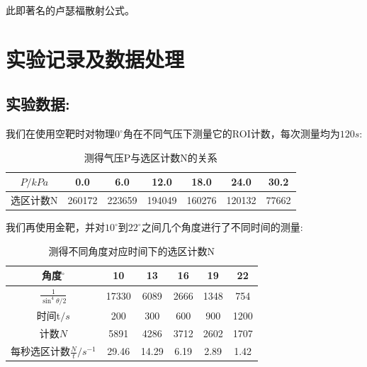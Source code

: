 \documentclass[utf8]{ctexart}
\begin{document}
此即著名的卢瑟福散射公式。


\section*{实验记录及数据处理}
\subsection*{实验数据:}

我们在使用空靶时对物理$0^{\circ}$角在不同气压下测量它的ROI计数，每次测量均为$120s$:
\begin{table}[!ht]
	\centering
	\caption{测得气压P与选区计数N的关系}
\begin{tabular}{|c|c|c|c|c|c|c|}
	\hline
	$P/kPa$ & 0.0 & 6.0 & 12.0 & 18.0 &  24.0 & 30.2 \\
	\hline
	选区计数N & 260172 & 223659 & 194049 & 160276 & 120132 & 77662 \\
	\hline
\end{tabular}
\end{table}

我们再使用金靶，并对$10^{\circ}$到$22^{\circ}$之间几个角度进行了不同时间的测量:
\begin{table}[!ht]
	\centering
	\caption{测得不同角度对应时间下的选区计数N}
	\begin{tabular}{|c|c|c|c|c|c|}
		\hline
		角度$^{\circ}$ & 10 & 13 & 16 & 19 & 22 \\
		\hline
		$\frac{1}{\sin^4{\theta/2}}$ & 17330 & 6089 & 2666 & 1348 & 754 \\
		\hline
		时间t$/s$ & 200 & 300 & 600 & 900 & 1200 \\
		\hline
		计数$N$ & 5891 & 4286 & 3712 & 2602 & 1707 \\
		\hline
		每秒选区计数$\frac{N}{t}/s^{-1}$ & 29.46 & 14.29 & 6.19 & 2.89 & 1.42 \\
		\hline
	\end{tabular}
\end{table}
\end{document}
